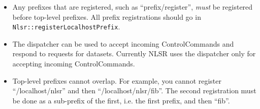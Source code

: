 \begin{itemize}
\item Any prefixes that are registered, such as ``prefix/register'',
  \emph{must} be registered before top-level prefixes. All prefix
  registrations should go in \texttt{Nlsr::registerLocalhostPrefix}.
\item The dispatcher can be used to accept incoming ControlCommands
  and respond to requests for datasets. Currently NLSR uses the
  dispatcher only for accepting incoming ControlCommands.
\item Top-level prefixes cannot overlap. For example, you cannot
  register ``/localhost/nlsr'' and then ``/localhost/nlsr/fib''. The
  second registration must be done as a sub-prefix of the first,
  i.e. the first prefix, and then ``fib''.
\end{itemize}
